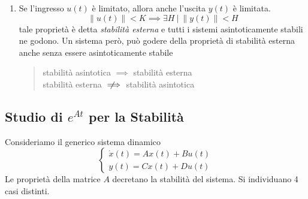 \documentclass[10pt, letterpaper]{report}
\begin{document}
\begin{enumerate}
\begin{center}
\begin{figure}[h!]
       \end{figure}
       \end{center}
       \item Se l'ingresso $u(t)$ è limitato, allora anche l'uscita $y(t)$ è limitata.
       $$  \left\lVert u(t) \right\rVert<K \implies \exists H \ | \  \left\lVert y(t) \right\rVert<H$$
       tale proprietà è detta \textit{stabilità esterna} e tutti i sistemi asintoticamente stabili ne godono. 
       Un sistema però, può godere della proprietà di stabilità esterna anche senza essere asintoticamente stabile 
       \begin{quote}
        stabilità asintotica $\implies$ stabilità esterna \\ 
        stabilità esterna $\notimplies$ stabilità asintotica
       \end{quote}
\end{enumerate}
\subsection{Studio di $e^{At}$ per la Stabilità}
Consideriamo il generico sistema dinamico 
$$ \begin{cases}
    \dot{x}(t)=Ax(t)+Bu(t)\\ y(t)=Cx(t)+Du(t)
\end{cases}$$
Le proprietà della matrice $A$ decretano la stabilità del sistema. Si individuano 4 casi distinti. 
\end{document}
